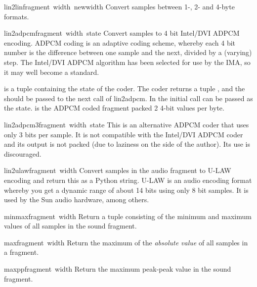 \begin{funcdesc}{lin2lin}{fragment\, width\, newwidth}
Convert samples between 1-, 2- and 4-byte formats.
\end{funcdesc}

\begin{funcdesc}{lin2adpcm}{fragment\, width\, state}
Convert samples to 4 bit Intel/DVI ADPCM encoding.  ADPCM coding is an
adaptive coding scheme, whereby each 4 bit number is the difference
between one sample and the next, divided by a (varying) step.  The
Intel/DVI ADPCM algorithm has been selected for use by the IMA, so it
may well become a standard.

 is a tuple containing the state of the coder.  The coder
returns a tuple , and the
 should be passed to the next call of lin2adpcm.  In the
initial call  can be passed as the state.  
is the ADPCM coded fragment packed 2 4-bit values per byte.
\end{funcdesc}

\begin{funcdesc}{lin2adpcm3}{fragment\, width\, state}
This is an alternative ADPCM coder that uses only 3 bits per sample.
It is not compatible with the Intel/DVI ADPCM coder and its output is
not packed (due to laziness on the side of the author).  Its use is
discouraged.
\end{funcdesc}

\begin{funcdesc}{lin2ulaw}{fragment\, width}
Convert samples in the audio fragment to U-LAW encoding and return
this as a Python string.  U-LAW is an audio encoding format whereby
you get a dynamic range of about 14 bits using only 8 bit samples.  It
is used by the Sun audio hardware, among others.
\end{funcdesc}

\begin{funcdesc}{minmax}{fragment\, width}
Return a tuple consisting of the minimum and maximum values of all
samples in the sound fragment.
\end{funcdesc}

\begin{funcdesc}{max}{fragment\, width}
Return the maximum of the \emph{absolute value} of all samples in a
fragment.
\end{funcdesc}

\begin{funcdesc}{maxpp}{fragment\, width}
Return the maximum peak-peak value in the sound fragment.
\end{funcdesc}

